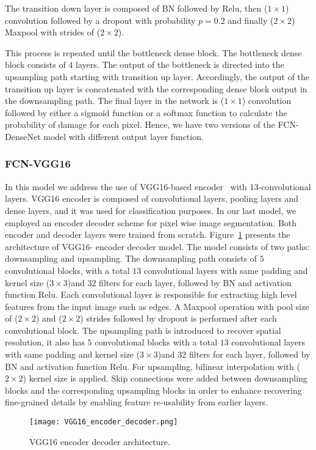 The transition down layer is composed of BN followed by Relu, then (\(1\times1\)) convolution followed by a dropout with probability \(p = 0.2\) and finally (\(2\times2\)) Maxpool with strides of (\(2\times2\)).

This process is repeated until the bottleneck dense block.
The bottleneck dense block consists of 4 layers.
The output of the bottleneck is directed into the upsampling path starting with transition up layer.
Accordingly, the output of the transition up layer is concatenated with the corresponding dense block output in the downsampling path.
The final layer in the network is  (\(1\times1\)) convolution followed by either a sigmoid function or a softmax function to calculate the probability of damage for each pixel.
Hence, we have two versions of the FCN-DenseNet model with different output layer function.


	\subsubsection{FCN-VGG16}
	In this model we address the use of VGG16-based encoder~\cite{Simonyan2015} with 13-convolutional layers.
	VGG16 encoder is composed of convolutional layers, pooling layers and dense layers, and it was used for classification purposes. 
	In our last model, we employed an encoder decoder scheme for pixel wise image segmentation. 
	Both encoder and decoder layers were trained from scratch.
	Figure~\ref{vgg16} presents the architecture of VGG16- encoder decoder model. 
	The model consists of two paths: downsampling and upsampling.
	The downsampling path consists of \(5\) convolutional blocks,  with a total \(13\) convolutional layers  with same padding and kernel size (\(3\times3\))and 32 filters for each layer, followed by BN and activation function Relu.
	Each convolutional layer is responsible for extracting high level features from the input image such as edges.
	A Maxpool operation with pool size of (\(2\times2\))  and (\(2\times2\)) strides followed by dropout is performed after each convolutional block. 
	The upsampling path is introduced to recover spatial resolution, it also has \(5\) convolutional blocks with a total \(13\) convolutional layers  with same padding and kernel size (\(3\times3\))and 32 filters for each layer, followed by BN and activation function Relu.
	For upsampling, bilinear interpolation with (\(2\times2\)) kernel size is applied.
	Skip connections were added between downsampling blocks and the corresponding upsampling blocks in order to enhance recovering fine-grained details by enabling feature re-usability from earlier layers.
	\begin{figure} [h!]
		\begin{center}
			\texttt{[image: VGG16\_encoder\_decoder.png]}
		\end{center}
		\caption{VGG16 encoder decoder architecture.} 
		\label{vgg16}
	\end{figure}



